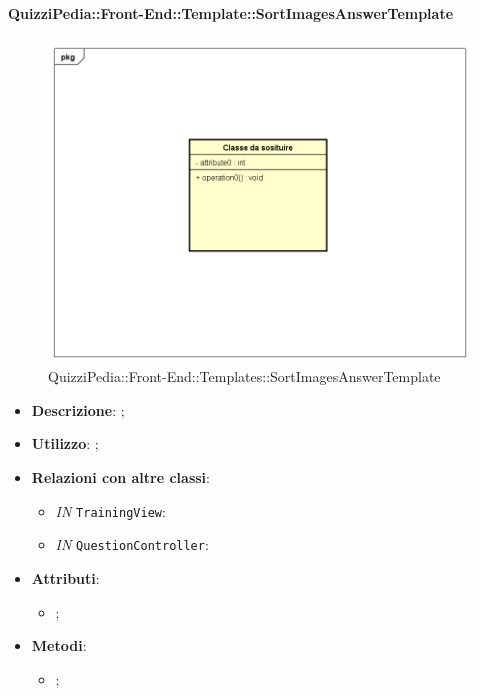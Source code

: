		\paragraph{QuizziPedia::Front-End::Template::SortImagesAnswerTemplate}
		
				\label{QuizziPedia::Front-End::Templates::SortImagesAnswerTemplate}

				\begin{figure}[h]
					\centering
					\includegraphics[scale=0.5,keepaspectratio]{UML/Classi/Front-End/Temporanea.png}
					\caption{QuizziPedia::Front-End::Templates::SortImagesAnswerTemplate}
				\end{figure}
				
			\begin{itemize}
				\item \textbf{Descrizione}: ;
				\item \textbf{Utilizzo}: ;
				\item \textbf{Relazioni con altre classi}: 
				\begin{itemize}
						\item \textit{IN} \texttt{TrainingView}: 
						\item \textit{IN} \texttt{QuestionController}:
				\end{itemize}
				\item \textbf{Attributi}: 
				\begin{itemize}
					\item ;
				\end{itemize}
				\item \textbf{Metodi}: 
				\begin{itemize}
					\item ;
				\end{itemize}
			\end{itemize}
		
